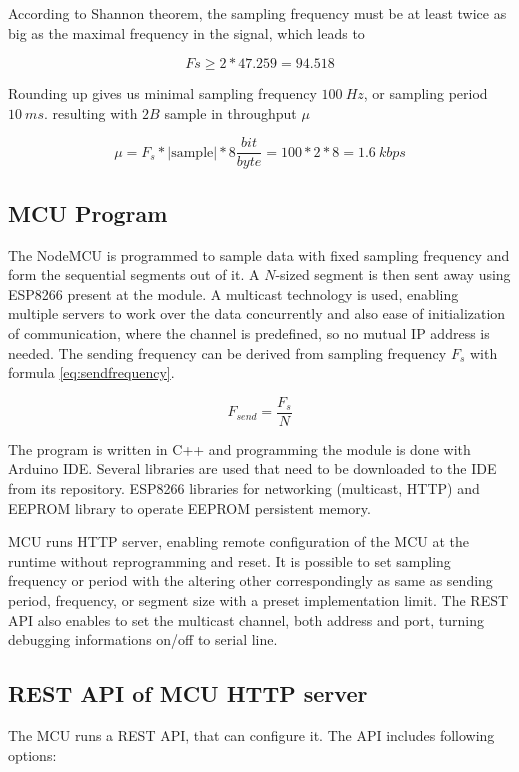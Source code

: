 According to Shannon theorem\cite{DigitalSignalProcessing}, the sampling frequency must be at least twice as big as the
maximal frequency in the signal, which leads to

\begin{equation}
Fs \geq 2*47.259 = 94.518 
\end{equation}

Rounding up gives us minimal sampling frequency $100~Hz$, or sampling period $10~ms$.
resulting with $2B$ sample in throughput $\mu$

\begin{equation}
\mu = F_s * |\text{sample}| * 8\frac{bit}{byte} = 100 * 2 * 8 = 1.6~kbps
\end{equation}


\subsection*{MCU Program}
The NodeMCU is programmed to sample data with fixed sampling frequency and form the sequential
segments out of it. A $N$-sized segment is then sent away using ESP8266 present at the module.
A multicast technology is used, enabling multiple servers to work over the data concurrently
and also ease of initialization of communication, where the channel is predefined, so
no mutual IP address is needed. The sending frequency can be derived from sampling frequency $F_s$
with formula \ref{eq:sendfrequency}.

\begin{equation}
F_{send} = \frac{F_s}{N}
\label{eq:sendfrequency}
\end{equation}

The program is written in C++ and programming the module is done with Arduino IDE. Several libraries
are used that need to be downloaded to the IDE from its repository. ESP8266 libraries for networking
(multicast, HTTP) and EEPROM library to operate EEPROM persistent memory.

MCU runs HTTP server, enabling remote configuration of the MCU at the runtime without reprogramming
and reset. It is possible to set sampling frequency or period with the altering other correspondingly
as same as sending period, frequency, or segment size with a preset implementation limit.
The REST API also enables to set the multicast channel, both address and port, turning
debugging informations on/off to serial line.

\subsection*{REST API of MCU HTTP server}
The MCU runs a REST API, that can configure it. The API includes following options:

